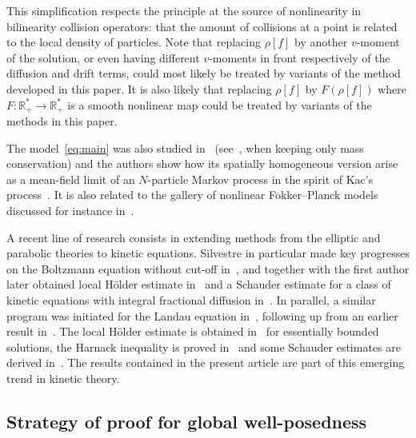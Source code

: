 \documentclass[AHL,Unicode,longabstracts,published]{cedram}
\newcommand{\R}{\mathbb{R}}
\newcommand*{\MK}{\mkern 2mu}
\begin{document}
This simplification respects the principle at the source of nonlinearity in bilinearity collision operators: that the amount of collisions at a point is related to the local density of particles. Note that replacing $\rho[f]$ by another $v$-moment of the solution, or even having different $v$-moments in front respectively of the diffusion and drift terms, could most likely be treated by variants of the method developed in this paper. It is also likely that replacing $\rho[f]$ by $F(\rho[f])$ where $F:\R_+^* \to \R_+^*$ is a smooth nonlinear map could be treated by variants of the methods in this paper.

The model~\eqref{eq:main} was also studied in~\cite{MR2252155} (see~\cite[equation$\MK$(9)]{MR2252155}, when keeping only mass conservation) and the authors show how its spatially homogeneous version arise as a mean-field limit of an $N$-particle Markov process in the spirit of Kac's process~\cite{MR0084985}. It is also related to the gallery of nonlinear Fokker--Planck models discussed for instance in~\cite{chavanis2008nonlinear}.

A recent line of research consists in extending methods from the elliptic and parabolic theories to kinetic equations. Silvestre in particular made key progresses on the Boltzmann equation without cut-off in~\cite{MR3551261}, and together with the first author later obtained local H\"older estimate in~\cite{is} and a Schauder estimate for a class of kinetic equations with integral fractional diffusion in~\cite{imbert2018schauder}. In parallel, a similar program was initiated for the Landau equation in~\cite{gimv}, following up from an earlier result in~\cite{wz09}. The local H\"older estimate is obtained in~\cite{gimv,wz09} for essentially bounded solutions, the Harnack inequality is proved in~\cite{gimv} and some Schauder estimates are derived in~\cite{hs}. The results contained in the present article are part of this emerging trend in kinetic theory.

\subsection{Strategy of proof for global well-posedness}
\end{document}
